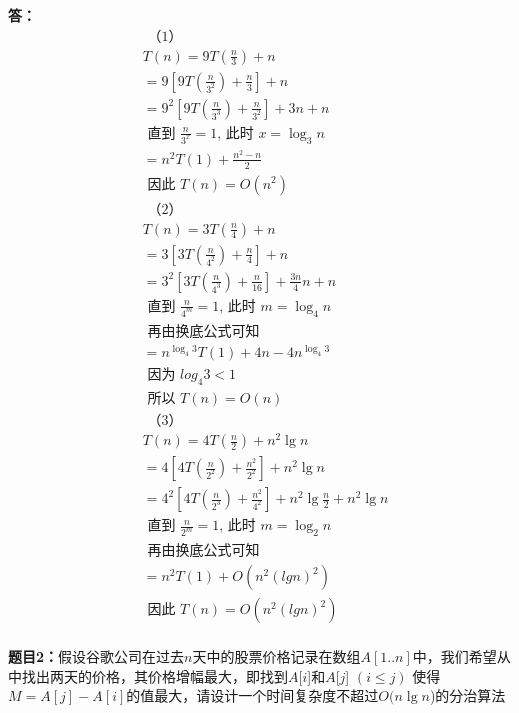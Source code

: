 \documentclass[12pt,a4paper]{article}
\begin{document}
\noindent
{\bf 答：}
$$
\begin{aligned}
&\text { （1）}\\
&T(n)=9 T\left(\frac{n}{3}\right)+n\\
&=9\left[9 T\left(\frac{n}{3^2}\right)+\frac{n}{3} \right]+n\\
&=9^2\left[9 T\left(\frac{n}{3^3}\right)+\frac{n}{3^2}\right]+3n+n\\
&\text { 直到 } \frac{n}{3^x}=1 \text {, 此时 } x=\log _3 n\\
&=n^2 T\left(1\right)+\frac{n^2-n}{2}\\
&\text { 因此 } T(n)=O(n^2) \\
&\text { （2）}\\
&T(n)=3 T\left(\frac{n}{4}\right)+n\\
&=3\left[3 T\left(\frac{n}{4^2}\right)+\frac{n}{4} \right]+n\\
&=3^2\left[3 T\left(\frac{n}{4^3}\right)+\frac{n}{16}\right]+\frac{3n}{4}n+n\\
&\text { 直到 } \frac{n}{4^m}=1 \text {, 此时 } m=\log _4 n\\
&\text { 再由换底公式可知 } \\
&=n^{\log_4{3}} T\left(1\right)+4n-4n^{\log_4{3}} \\
&\text { 因为 } log_4{3}<1 \\
&\text { 所以 } T(n)=O(n) \\
&\text { （3）}\\
&T(n)=4 T\left(\frac{n}{2}\right)+n^2\lg n\\
&=4\left[4 T\left(\frac{n}{2^2}\right)+\frac{n^2}{2^2} \right]+n^2\lg n\\
&=4^2\left[4 T\left(\frac{n}{2^3}\right)+\frac{n^2}{4^2}\right]+n^2\lg{\frac{n}{2}}+n^2\lg {n}\\
&\text { 直到 } \frac{n}{2^m}=1 \text {, 此时 } m=\log _2 n\\
&\text { 再由换底公式可知 } \\
&=n^2 T\left(1\right)+O(n^2(lg n)^2)\\
&\text { 因此 } T(n)=O(n^2(lg n)^2) \\
\end{aligned}
$$

\noindent
{\bf 题目2：}假设谷歌公司在过去$n$天中的股票价格记录在数组$A[1..n]$中，我们希望从中找出两天的价格，其价格增幅最大，即找到$A$[$i$]和$A$[$j$] $(i\leq j)$ 使得$M=A[j]-A[i]$的值最大，请设计一个时间复杂度不超过$O(n\lg{n}$)的分治算法
\end{document}
